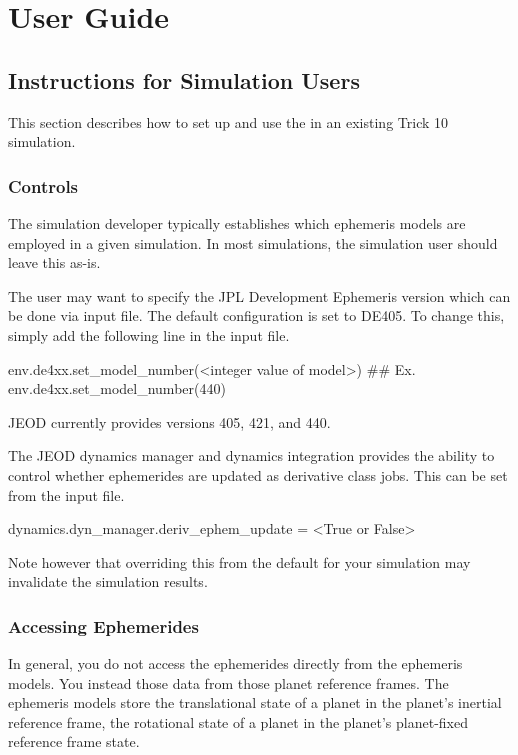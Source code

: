 \chapter{User Guide}\label{ch:user}

\section{Instructions for Simulation Users}
\label{sec:guide_sim_users}

This section describes how to set up and use the \ModelDesc in an 
existing Trick 10 simulation.

\subsection{Controls}

The simulation developer typically establishes which ephemeris models are
employed in a given simulation.
In most simulations, the simulation user should leave this as-is.

The user may want to specify the JPL Development Ephemeris version which can be 
done via input file. The default configuration is set to DE405. To change this, 
simply add the following line in the input file.
 
\begin{codeblock}
env.de4xx.set_model_number(<integer value of model>)
## Ex.
env.de4xx.set_model_number(440)
\end{codeblock}

JEOD currently provides versions 405, 421, and 440.

The JEOD dynamics manager and dynamics integration provides the ability
to control whether ephemerides are updated as derivative class jobs.
This can be set from the input file.
\begin{codeblock}
dynamics.dyn_manager.deriv_ephem_update = <True or False>
\end{codeblock}
Note however that overriding this from the default for your simulation
may invalidate the simulation results.


\subsection{Accessing Ephemerides}
\label{sec:guide_sim_users_accessing_ephemerides}
In general, you do not access the ephemerides directly from the
ephemeris models. You instead those data from those planet reference frames.
The ephemeris models store the translational state of a planet
in the planet's inertial reference frame, the rotational state of
a planet in the planet's planet-fixed reference frame state.


